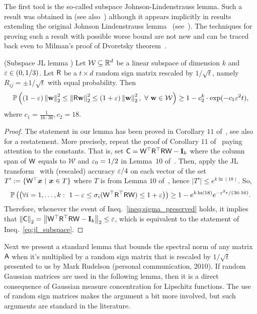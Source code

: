 %
The first tool is the so-called subspace Johnson-Lindenstrauss lemma. Such a result was obtained in \cite{sarlos} (see also~\cite[Theorem~1.3]{jl:manifold}) although it appears implicitly in results extending the original Johnson Lindenstrauss lemma~\cite{JL84} (see~\cite{magen07}). The techniques for proving such a result with possible worse bound are not new and can be traced back even to Milman's proof of Dvoretsky theorem~\cite{Dvoretsky:Milman}.
\begin{lemma}\label{lem:jl_subspace} (Subspace JL lemma \cite{sarlos})
Let $\mathcal{W} \subseteq \mathbb{R}^d$ be a linear subspace of dimension $k$ and
$\varepsilon\in{(0, 1/3)}$. Let ${\mathsf{R} }$ be a $t\times d$ random sign matrix rescaled by $1/\sqrt{t}$, namely $R_{ij} = \pm 1/\sqrt{t}$ with equal probability.
Then
\begin{align}\label{eq:jl_subspace}
\mathbb{P}\left( (1-\varepsilon) \left\|{\mathbf{w}}\right\|_2^2 \leq \left\|{\mathsf{R} }{\mathbf{w}}\right\|_2^2 \leq (1+\varepsilon)\left\|{\mathbf{w}}\right\|_2^2,\ \forall\ {\mathbf{w}}\in\mathcal{W} \right) \geq 1 - c_2^k \cdot \hbox{\textrm exp} (- c_1 \varepsilon^2 t),
\end{align}
where $c_1 = \frac1{16 \cdot 36},c_2 = 18$.
\end{lemma}
\begin{proof}
The  statement in our lemma has been proved in Corollary $11$ of~\cite{sarlos}, see also~\cite[Theorem~$1.3$]{jl:manifold} for a restatement. More precisely, repeat the proof of Corollary $11$ of~\cite{sarlos} paying attention to the constants. That is, set ${\mathsf{C} }={\mathsf{W} }^\top {\ensuremath{\mathsf{R} }}^\top {\ensuremath{\mathsf{R} }} {\ensuremath{\mathsf{W} }} -\mathbf{I}_k$ where the column span of ${\mathsf{W} }$ equals to $\mathcal{W}$ and $\varepsilon_0=1/2$ in Lemma~$10$ of~\cite{sarlos}. Then, apply the JL transform~\cite{Ach03} with (rescaled) accuracy $\varepsilon/4$ on each vector of the set $T':=\{\matW^\top \vct{x}\ |\ \vct{x} \in T \}$ where $T$ is from Lemma $10$ of~\cite{sarlos}, hence $|T'| \leq e^{k\ln (18)}$. So,
\begin{equation}\label{ineq:sigma_preserved}
	\mathbb{P}\left(\left(  \forall i = 1,\dots ,k :\  1-\varepsilon \leq \sigma_i({\mathsf{W} }^\top {\ensuremath{\mathsf{R} }}^\top {\ensuremath{\mathsf{R} }} {\ensuremath{\mathsf{W} }}) \leq 1+\varepsilon \right) \right) \geq 1 - e^{k\ln (18) } e^{-\varepsilon^2 r/(36 \cdot 16) } .
\end{equation}
%
Therefore, whenever the event of Ineq.~\eqref{ineq:sigma_preserved} holds, it implies that $\left\|{\mathsf{C} }\right\|_2 = \left\|{\mathsf{W} }^\top {\ensuremath{\mathsf{R} }}^\top {\ensuremath{\mathsf{R} }}{\ensuremath{\mathsf{W} }} - \mathbf{I}_k\right\|_2 \leq \varepsilon$, which is equivalent to the statement of Ineq.~\eqref{eq:jl_subspace}.
\end{proof}
%
%
%
%
Next we present a standard lemma that bounds the spectral norm of any matrix ${\mathsf{A} }$ when it's multiplied by a random sign matrix that is rescaled by $1/\sqrt{t}$ presented to us by Mark Rudelson (personal communication, 2010). If random Gaussian matrices are used in the following lemma, then it is a direct consequence of Gaussian measure concentration for Lipschitz functions. The use of random sign matrices makes the argument a bit more involved, but such arguments are standard in the literature.
